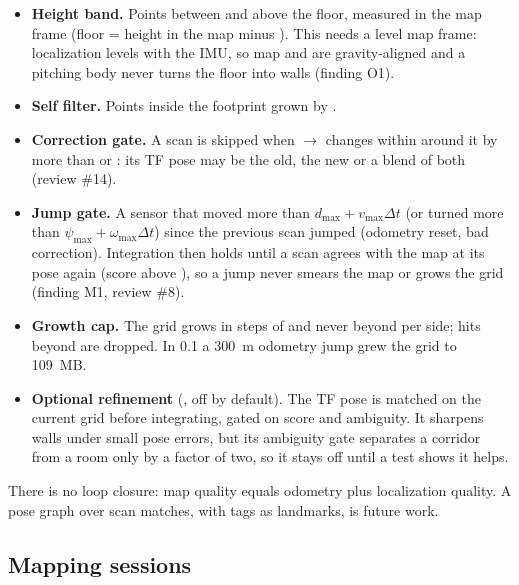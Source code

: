 \begin{itemize}
  \item \textbf{Height band.} Points between  and 
    above the floor, measured in the map frame (floor =  height in the map minus
    ). This needs a level map frame: localization levels 
    with the IMU, so map and  are gravity-aligned and a pitching body never turns the
    floor into walls (finding O1).
  \item \textbf{Self filter.} Points inside the footprint grown by .
  \item \textbf{Correction gate.} A scan is skipped when $\to$ changes within
     around it by more than  or
    : its TF pose may be the old, the new or a blend of both
    (review \#14).
  \item \textbf{Jump gate.} A sensor that moved more than $d_{\max} + v_{\max}\Delta t$ (or turned
    more than $\psi_{\max} + \omega_{\max}\Delta t$) since the previous scan jumped (odometry
    reset, bad correction). Integration then holds until a scan agrees with the map at its pose
    again (score above ), so a jump never smears the map or grows the
    grid (finding M1, review \#8).
  \item \textbf{Growth cap.} The grid grows in steps of  and never beyond
     per side; hits beyond are dropped. In 0.1 a 300~m odometry jump grew
    the grid to 109~MB.
  \item \textbf{Optional refinement} (, off by default). The TF pose is
    matched on the current grid before integrating, gated on score and ambiguity. It sharpens
    walls under small pose errors, but its ambiguity gate separates a corridor from a room only
    by a factor of two, so it stays off until a test shows it helps.
\end{itemize}

There is no loop closure: map quality equals odometry plus localization quality. A pose graph
over scan matches, with tags as landmarks, is future work.

\subsection{Mapping sessions}

